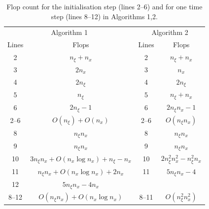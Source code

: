 \documentclass[a4paper,final]{siamart190516}
\newcommand{\otoprule}{\midrule[\heavyrulewidth]}
\begin{document}
\begin{table}
  \centering
  \caption{Flop count for the initialisation step (lines 2--6) and for one time
  step (lines 8--12) in Algorithms 1,2.}
  \label{tab:flops}
\begin{tabular}{cccc}
  \toprule
  \multicolumn{2}{c}{Algorithm 1} & \multicolumn{2}{c}{Algorithm 2} \\
  Lines & Flops & Lines & Flops \\
  \otoprule
   2    & $  n_\xi + n_x        $  &  2   & $  n_\xi + n_x                  $ \\
   3    & $  2n_x               $  &  3   & $     n_x                       $ \\
   4    & $  2n_\xi             $  &  4   & $    2n_\xi                     $ \\
   5    & $  n_\xi              $  &  5   & $   n_\xi + n_x                 $ \\
   6    & $  2n_\xi-1           $  &  6   & $   2n_\xi n_x -1               $ \\
  \midrule
  2--6 & $  O(n_\xi) + O(n_x)  $  & 2--6 & $ O(n_\xi n_x) $ \\
  \midrule
   8    & $  n_\xi n_x                                              $  &  8   & $  n_\xi n_x                            $ \\
   9    & $  n_\xi n_x                                              $  &  9   & $  n_\xi n_x                            $ \\  
   10   & $  3 n_\xi n_x + O(n_x \log n_x) + n_\xi - n_x               $  &  10  & $  2n^2_\xi n_x^2 - n^2_\xi n_x         $ \\
   11   & $  n_\xi n_x + O(n_x \log n_x) + 2n_x                        $  &  11  & $  5n_\xi n_x -4                        $ \\
   12   & $  5 n_\xi n_x - 4 n_x                                    $  &      & $                                       $ \\
  \midrule
   8--12 & $O(n_\xi n_x) + O(n_x \log n_x)$  & 8--11 & $ O(n^2_\xi n^2_x) $ \\
  \bottomrule
%
\end{tabular}
\end{table}
\end{document}

